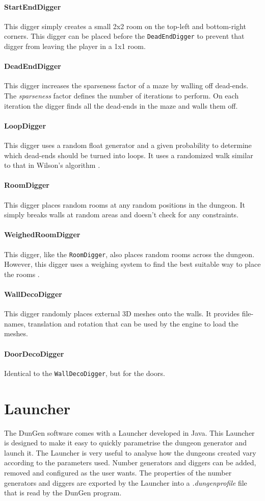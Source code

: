 \paragraph{StartEndDigger} This digger simply creates a small 2x2 room on the top-left and bottom-right corners. This digger can be placed before the \texttt{DeadEndDigger} to prevent that digger from leaving the player in a 1x1 room.
\paragraph{DeadEndDigger} This digger increases the sparseness factor of a maze by walling off dead-ends. The {\em sparseness} factor defines the number of iterations to perform. On each iteration the digger finds all the dead-ends in the maze and walls them off.
\paragraph{LoopDigger} This digger uses a random float generator and a given probability to determine which dead-ends should be turned into loops. It uses a randomized walk similar to that in Wilson's algorithm \citep{DBLP:conf/stoc/Wilson96}.
\paragraph{RoomDigger} This digger places random rooms at any random positions in the dungeon. It simply breaks walls at random areas and doesn't check for any constraints.
\paragraph{WeighedRoomDigger} This digger, like the \texttt{RoomDigger}, also places random rooms across the dungeon. However, this digger uses a weighing system to find the best suitable way to place the rooms \citep{JBuck}.
\paragraph{WallDecoDigger} This digger randomly places external 3D meshes onto the walls. It provides file-names, translation and rotation that can be used by the engine to load the meshes.
\paragraph{DoorDecoDigger} Identical to the \texttt{WallDecoDigger}, but for the doors.

\section{Launcher}
The DunGen software comes with a Launcher developed in Java. This Launcher is designed to make it easy to quickly parametrise the dungeon generator and launch it. The Launcher is very useful to analyse how the dungeons created vary according to the parameters used. Number generators and diggers can be added, removed and configured as the user wants. The properties of the number generators and diggers are exported by the Launcher into a {\em .dungenprofile} file that is read by the DunGen program.

